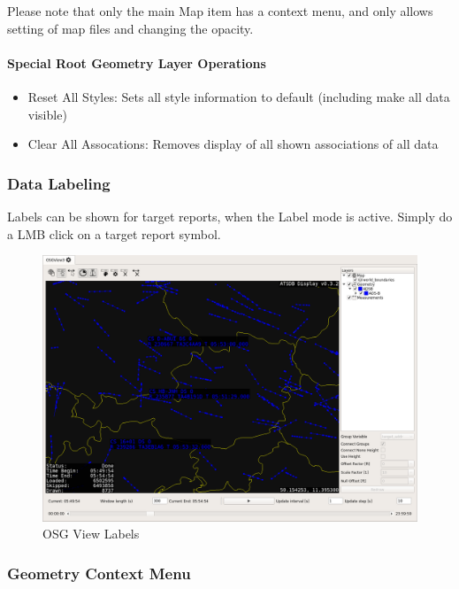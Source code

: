 {Please note that only the main Map item has a context menu, and only allows setting of map files and changing the opacity.

\paragraph{Special Root Geometry Layer Operations}

\begin{itemize}
 \item Reset All Styles: Sets all style information to default (including make all data visible)
 \item Clear All Assocations: Removes display of all shown associations of all data
\end{itemize}


\subsubsection{Data Labeling}

Labels can be shown for target reports, when the Label mode is active. Simply do a LMB click on a target report symbol.

\begin{figure}[H]
    \hspace*{-2cm}
    \includegraphics[width=18cm,frame]{../screenshots/osgview_labels.png}
  \caption{OSG View Labels}
\end{figure}

\subsubsection{Geometry Context Menu}

}
